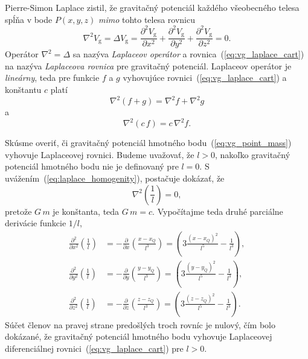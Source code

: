 \documentclass[a4paper, 12pt]{book}
\newcommand{\gidx}{\mathrm g}
\begin{document}
Pierre-Simon Laplace zistil, že gravitačný potenciál každého všeobecného telesa 
spĺňa v bode $P(x, y, z)$ \emph{mimo} tohto telesa rovnicu
%
\begin{equation}
\label{eq:vg_laplace_cart}
\nabla^2 V_\gidx = \Delta V_\gidx = \frac{\partial^2 V_\gidx}{\partial x^2}
+ \frac{\partial^2 V_\gidx}{\partial y^2} + \frac{\partial^2 V_\gidx}{\partial 
z^2} = 0{.}
\end{equation}
%
Operátor $\nabla^2 = \Delta$ sa nazýva \emph{Laplaceov operátor} 
a rovnica~(\ref{eq:vg_laplace_cart}) na nazýva \emph{Laplaceova rovnica} pre 
gravitačný potenciál.  Laplaceov operátor je \emph{lineárny}, teda pre funkcie 
$f$ a $g$ vyhovujúce rovnici~(\ref{eq:vg_laplace_cart}) a konštantu $c$ platí
%
\begin{equation}
\label{eq:laplace_additivity}
\nabla^2 \left(f + g \right) = \nabla^2 f + \nabla^2 g
\end{equation}
%
a
%
\begin{equation}
\label{eq:laplace_homogenity}
\nabla^2 (c \, f) = c \, \nabla^2 f{.}
\end{equation}

Skúsme overiť, či gravitačný potenciál hmotného bodu~(\ref{eq:vg_point_mass}) 
vyhovuje Laplaceovej rovnici.  Budeme uvažovať, že $l > 0$, nakoľko gravitačný 
potenciál hmotného bodu nie je definovaný pre $l = 0$.  
S uvážením~(\ref{eq:laplace_homogenity}), postačuje dokázať, že
%
\begin{equation}
\label{eq:nabla_l}
\nabla^2 \left( \frac{1}{l} \right) = 0{,}
\end{equation}
%
pretože $G \, m$ je konštanta, teda $G \, m = c$.  Vypočítajme teda druhé 
parciálne derivácie funkcie $1 \slash l$,
%
\begin{equation}
\label{eq:l_2nd_derivatives}
\begin{split}
\frac{\partial^2}{\partial x^2} \left( \frac{1}{l} \right) &= 
-\frac{\partial}{\partial x} \left( \frac{x - x_Q}{l^3} \right) = \left(3 
\frac{(x - x_Q)^2}{l^5} - \frac{1}{l^3} \right){,}\\
%
\frac{\partial^2}{\partial y^2} \left( \frac{1}{l} \right) &= 
-\frac{\partial}{\partial y} \left( \frac{y - y_Q}{l^3} \right) = \left(3 
\frac{(y - y_Q)^2}{l^5} - \frac{1}{l^3} \right){,}\\
%
\frac{\partial^2}{\partial z^2} \left( \frac{1}{l} \right) &= 
-\frac{\partial}{\partial z} \left( \frac{z - z_Q}{l^3} \right) = \left(3 
\frac{(z - z_Q)^2}{l^5} - \frac{1}{l^3} \right){.}
\end{split}
\end{equation}
%
Súčet členov na pravej strane predošlých troch rovníc je nulový, čím bolo 
dokázané, že gravitačný potenciál hmotného bodu vyhovuje Laplaceovej 
diferenciálnej rovnici~(\ref{eq:vg_laplace_cart}) pre $l > 0$.
\end{document}
